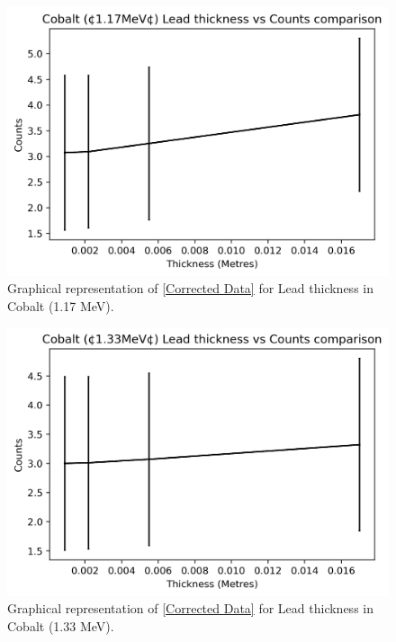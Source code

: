 \documentclass[12pt]{article}
\begin{document}
\begin{multicols}{2}
\begin{figure}[H]
\centering
\includegraphics[scale=0.6]{Images/CobaltLead117Final.png}
\caption{Graphical representation of \cref{Corrected Data} for Lead thickness in Cobalt (1.17 MeV).}
\label{Cobalt 117 Lead Final Counts}
\end{figure}

\begin{figure}[H]
\centering
\includegraphics[scale=0.6]{Images/CobaltLead133Final.png}
\caption{Graphical representation of \cref{Corrected Data} for Lead thickness in Cobalt (1.33 MeV).}
\label{Cobalt 133 Lead Final Counts}
\end{figure}
\end{multicols}
\newpage
\end{document}
